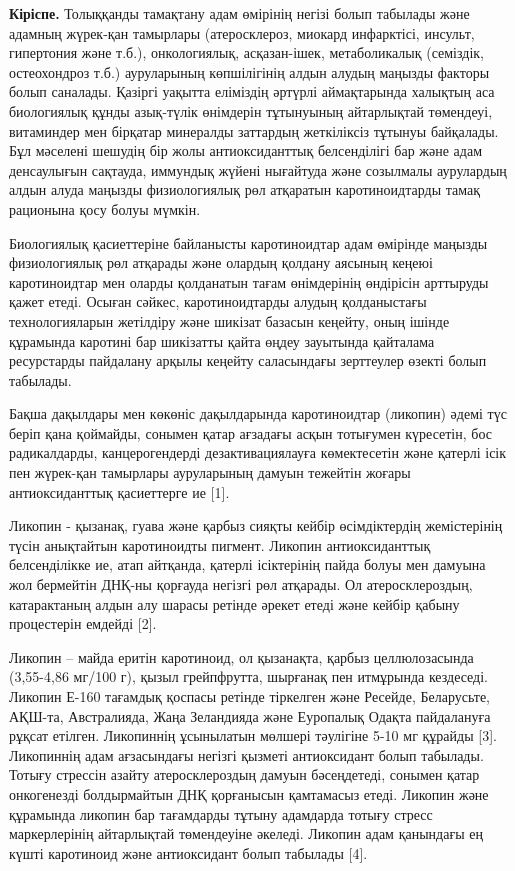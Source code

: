 \begin{multicols}{2}
{\bfseries Кіріспе.} Толыққанды тамақтану адам өмірінің негізі болып
табылады және адамның жүрек-қан тамырлары (атеросклероз, миокард
инфарктісі, инсульт, гипертония және т.б.), онкологиялық, асқазан-ішек,
метаболикалық (семіздік, остеохондроз т.б.) ауруларының көпшілігінің
алдын алудың маңызды факторы болып саналады. Қазіргі уақытта еліміздің
әртүрлі аймақтарында халықтың аса биологиялық құнды азық-түлік өнімдерін
тұтынуының айтарлықтай төмендеуі, витаминдер мен бірқатар минералды
заттардың жеткіліксіз тұтынуы байқалады. Бұл мәселені шешудің бір жолы
антиоксиданттық белсенділігі бар және адам денсаулығын сақтауда,
иммундық жүйені нығайтуда және созылмалы аурулардың алдын алуда маңызды
физиологиялық рөл атқаратын каротиноидтарды тамақ рационына қосу болуы
мүмкін.

Биологиялық қасиеттеріне байланысты каротиноидтар адам өмірінде маңызды
физиологиялық рөл атқарады және олардың қолдану аясының кеңеюі
каротиноидтар мен оларды қолданатын тағам өнімдерінің өндірісін
арттыруды қажет етеді. Осыған сәйкес, каротиноидтарды алудың
қолданыстағы технологияларын жетілдіру және шикізат базасын кеңейту,
оның ішінде құрамында каротині бар шикізатты қайта өңдеу зауытында
қайталама ресурстарды пайдалану арқылы кеңейту саласындағы зерттеулер
өзекті болып табылады.

Бақша дақылдары мен көкөніс дақылдарында каротиноидтар (ликопин) әдемі
түс беріп қана қоймайды, сонымен қатар ағзадағы асқын тотығумен
күресетін, бос радикалдарды, канцерогендерді дезактивациялауға
көмектесетін және қатерлі ісік пен жүрек-қан тамырлары ауруларының
дамуын тежейтін жоғары антиоксиданттық қасиеттерге ие {[}1{]}.

Ликопин - қызанақ, гуава және қарбыз сияқты кейбір өсімдіктердің
жемістерінің түсін анықтайтын каротиноидты пигмент. Ликопин
антиоксиданттық белсенділікке ие, атап айтқанда, қатерлі ісіктерінің
пайда болуы мен дамуына жол бермейтін ДНҚ-ны қорғауда негізгі рөл
атқарады. Ол атеросклероздың, катарактаның алдын алу шарасы ретінде
әрекет етеді және кейбір қабыну процестерін емдейді {[}2{]}.

Ликопин -- майда еритін каротиноид, ол қызанақта, қарбыз целлюлозасында
(3,55-4,86 мг/100 г), қызыл грейпфрутта, шырғанақ пен итмұрында
кездеседі. Ликопин Е-160 тағамдық қоспасы ретінде тіркелген және
Ресейде, Беларусьте, АҚШ-та, Австралияда, Жаңа Зеландияда және Еуропалық
Одақта пайдалануға рұқсат етілген. Ликопиннің ұсынылатын мөлшері
тәулігіне 5-10 мг құрайды {[}3{]}. Ликопиннің адам ағзасындағы негізгі
қызметі антиоксидант болып табылады. Тотығу стрессін азайту
атеросклероздың дамуын бәсеңдетеді, сонымен қатар онкогенезді
болдырмайтын ДНҚ қорғанысын қамтамасыз етеді. Ликопин және құрамында
ликопин бар тағамдарды тұтыну адамдарда тотығу стресс маркерлерінің
айтарлықтай төмендеуіне әкеледі. Ликопин адам қанындағы ең күшті
каротиноид және антиоксидант болып табылады {[}4{]}.


\end{multicols}
